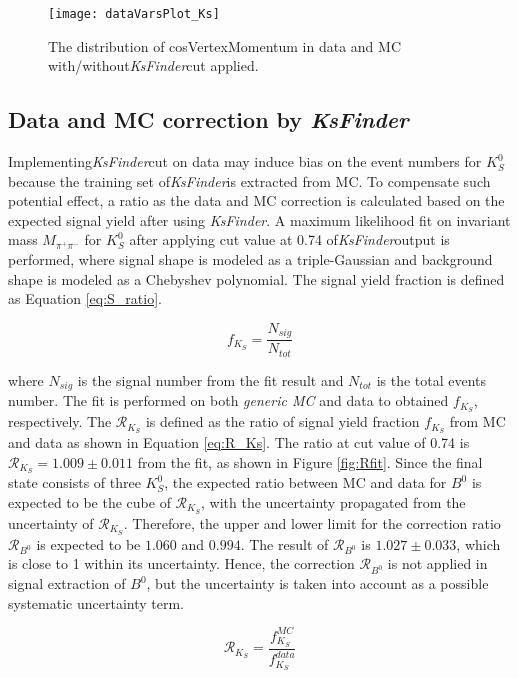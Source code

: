  \begin{figure}[htpb]
	\centering
	\texttt{[image: dataVarsPlot\_Ks]}
	\caption{The distribution of {cosVertexMomentum} in data and MC with/without\textit{KsFinder}cut applied.}
	\label{fig:cosVex_dataMC}
\end{figure}

\subsection{Data and MC correction by \textit{KsFinder}}
Implementing\textit{KsFinder}cut on data may induce bias on the event numbers for $K_S^0$ because the training set of\textit{KsFinder}is extracted from MC. To compensate such potential effect, a ratio as the data and MC correction is calculated based on the expected signal yield after using \textit{KsFinder}. A maximum likelihood fit on invariant mass $M_{\pi^+\pi^-}$ for $K_S^0$ after applying cut value at 0.74 of\textit{KsFinder}output is performed, where signal shape is modeled as a triple-Gaussian and background shape is modeled as a Chebyshev polynomial. The signal yield fraction is defined as Equation \ref{eq:S_ratio}.

\begin{equation}\label{eq:S_ratio}
	f_{K_S} = \frac{N_{sig}}{N_{tot}}
\end{equation}

where $N_{sig}$ is the signal number from the fit result and $N_{tot}$ is the total events number.
The fit is performed on both \textit{generic MC} and data to obtained $f_{K_S} $, respectively.
The $\mathcal{R}_{K_S}$ is defined as the ratio of signal yield fraction  $f_{K_S} $ from MC and data as shown in Equation \ref{eq:R_Ks}. The ratio at cut value of 0.74 is $\mathcal{R}_{K_S} = 1.009\pm 0.011$ from the fit, as shown in Figure \ref{fig:Rfit}. Since the final state consists of three $K_S^0$, the expected ratio between MC and data for $B^0$ is expected to be the cube of $\mathcal{R}_{K_S}$, with the uncertainty propagated from the uncertainty of $\mathcal{R}_{K_S}$.  Therefore, the upper and lower limit for the correction ratio  $\mathcal{R}_{B^0}$ is expected to be $1.060$ and $0.994$. The result of $\mathcal{R}_{B^0}$ is $1.027 \pm 0.033$, which is close to 1 within its uncertainty. Hence, the correction $\mathcal{R}_{B^0}$ is not applied in signal extraction of $B^0$, but the uncertainty is taken into account as a possible systematic uncertainty term. 
 
\begin{equation}\label{eq:R_Ks}
\mathcal{R}_{K_S} = \frac{f_{K_S}^{MC}}{f_{K_S}^{data}}
\end{equation}

